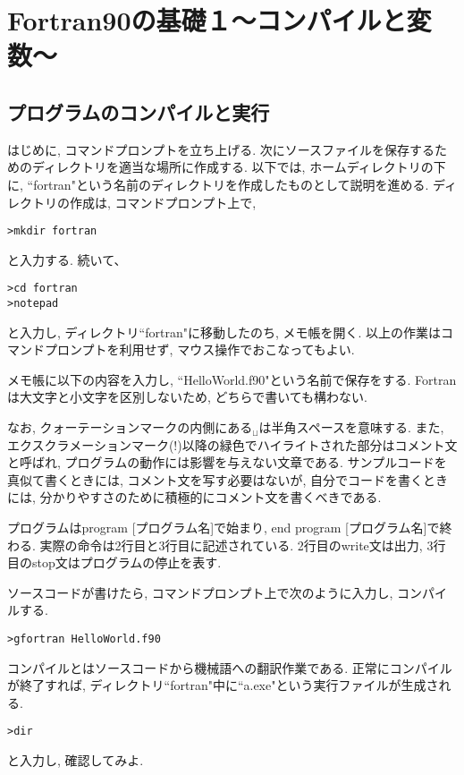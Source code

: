 \chapter{Fortran90の基礎１〜コンパイルと変数〜}

\section{プログラムのコンパイルと実行}
はじめに, コマンドプロンプトを立ち上げる.
次にソースファイルを保存するためのディレクトリを適当な場所に作成する.
以下では, ホームディレクトリの下に, ``fortran"という名前のディレクトリを作成したものとして説明を進める.
ディレクトリの作成は, コマンドプロンプト上で,
\begin{Verbatim}[frame=single]
>mkdir fortran
\end{Verbatim}
と入力する. 続いて、
\begin{Verbatim}[frame=single]
>cd fortran
>notepad
\end{Verbatim}
と入力し, ディレクトリ``fortran"に移動したのち, メモ帳を開く.
以上の作業はコマンドプロンプトを利用せず, マウス操作でおこなってもよい.

メモ帳に以下の内容を入力し, ``HelloWorld.f90"という名前で保存をする.
Fortranは大文字と小文字を区別しないため, どちらで書いても構わない.

なお, クォーテーションマークの内側にある$_{\sqcup}$は半角スペースを意味する.
また, エクスクラメーションマーク(!)以降の緑色でハイライトされた部分はコメント文と呼ばれ,
プログラムの動作には影響を与えない文章である.
サンプルコードを真似て書くときには, コメント文を写す必要はないが,
自分でコードを書くときには, 分かりやすさのために積極的にコメント文を書くべきである.

プログラムはprogram [プログラム名]で始まり, end program [プログラム名]で終わる.
実際の命令は2行目と3行目に記述されている.
2行目のwrite文は出力, 3行目のstop文はプログラムの停止を表す.


ソースコードが書けたら, コマンドプロンプト上で次のように入力し, コンパイルする.
\begin{Verbatim}[frame=single]
>gfortran HelloWorld.f90
\end{Verbatim}
コンパイルとはソースコードから機械語への翻訳作業である.
正常にコンパイルが終了すれば, ディレクトリ``fortran"中に``a.exe"という実行ファイルが生成される.
\begin{Verbatim}[frame=single]
>dir
\end{Verbatim}
と入力し, 確認してみよ.

